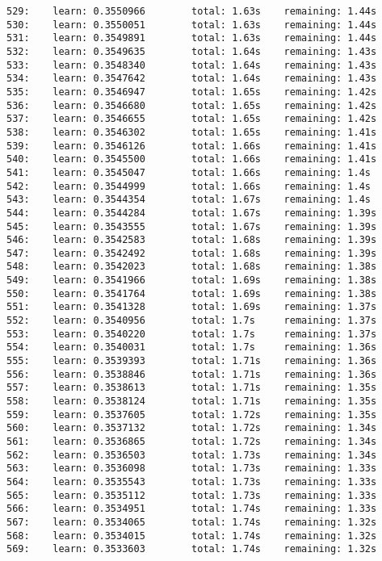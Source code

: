 \documentclass[11pt]{article}
\begin{document}
\begin{Verbatim}[commandchars=\\\{\}]
529:    learn: 0.3550966        total: 1.63s    remaining: 1.44s
530:    learn: 0.3550051        total: 1.63s    remaining: 1.44s
531:    learn: 0.3549891        total: 1.63s    remaining: 1.44s
532:    learn: 0.3549635        total: 1.64s    remaining: 1.43s
533:    learn: 0.3548340        total: 1.64s    remaining: 1.43s
534:    learn: 0.3547642        total: 1.64s    remaining: 1.43s
535:    learn: 0.3546947        total: 1.65s    remaining: 1.42s
536:    learn: 0.3546680        total: 1.65s    remaining: 1.42s
537:    learn: 0.3546655        total: 1.65s    remaining: 1.42s
538:    learn: 0.3546302        total: 1.65s    remaining: 1.41s
539:    learn: 0.3546126        total: 1.66s    remaining: 1.41s
540:    learn: 0.3545500        total: 1.66s    remaining: 1.41s
541:    learn: 0.3545047        total: 1.66s    remaining: 1.4s
542:    learn: 0.3544999        total: 1.66s    remaining: 1.4s
543:    learn: 0.3544354        total: 1.67s    remaining: 1.4s
544:    learn: 0.3544284        total: 1.67s    remaining: 1.39s
545:    learn: 0.3543555        total: 1.67s    remaining: 1.39s
546:    learn: 0.3542583        total: 1.68s    remaining: 1.39s
547:    learn: 0.3542492        total: 1.68s    remaining: 1.39s
548:    learn: 0.3542023        total: 1.68s    remaining: 1.38s
549:    learn: 0.3541966        total: 1.69s    remaining: 1.38s
550:    learn: 0.3541764        total: 1.69s    remaining: 1.38s
551:    learn: 0.3541328        total: 1.69s    remaining: 1.37s
552:    learn: 0.3540956        total: 1.7s     remaining: 1.37s
553:    learn: 0.3540220        total: 1.7s     remaining: 1.37s
554:    learn: 0.3540031        total: 1.7s     remaining: 1.36s
555:    learn: 0.3539393        total: 1.71s    remaining: 1.36s
556:    learn: 0.3538846        total: 1.71s    remaining: 1.36s
557:    learn: 0.3538613        total: 1.71s    remaining: 1.35s
558:    learn: 0.3538124        total: 1.71s    remaining: 1.35s
559:    learn: 0.3537605        total: 1.72s    remaining: 1.35s
560:    learn: 0.3537132        total: 1.72s    remaining: 1.34s
561:    learn: 0.3536865        total: 1.72s    remaining: 1.34s
562:    learn: 0.3536503        total: 1.73s    remaining: 1.34s
563:    learn: 0.3536098        total: 1.73s    remaining: 1.33s
564:    learn: 0.3535543        total: 1.73s    remaining: 1.33s
565:    learn: 0.3535112        total: 1.73s    remaining: 1.33s
566:    learn: 0.3534951        total: 1.74s    remaining: 1.33s
567:    learn: 0.3534065        total: 1.74s    remaining: 1.32s
568:    learn: 0.3534015        total: 1.74s    remaining: 1.32s
569:    learn: 0.3533603        total: 1.74s    remaining: 1.32s

\end{Verbatim}
\end{document}
